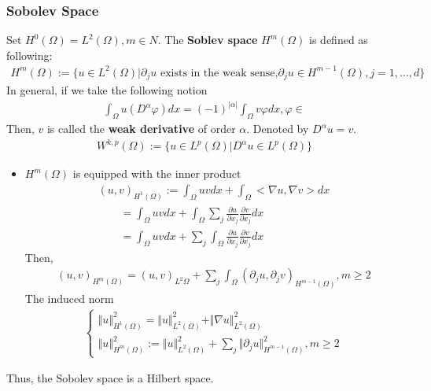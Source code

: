 \documentclass[Total.tex]{subfiles}
\begin{document}
				\subsubsection{Sobolev Space}	
					\begin{Def}
						Set $H^0(\Omega)=L^2(\Omega),m\in N$. The \textbf{Soblev space} $H^m(\Omega)$ is defined as following:
						\begin{gather*}
							H^m(\Omega):=\{u\in L^2(\Omega)|\partial_j u\mbox{ exists in the weak sense,}\partial_j u\in H^{m-1}(\Omega),j=1,\dots,d\}
						\end{gather*}
						In general, if we take the following notion
						\begin{gather*}
							\int_\Omega u(D^\alpha \varphi) dx=(-1)^{|\alpha|}\int_\Omega v\varphi dx,\varphi\in 
						\end{gather*}
						Then, $v$ is called the \textbf{weak derivative} of order $\alpha$. Denoted by $D^\alpha u=v$.
						\begin{gather*}
						 W^{k,p}(\Omega):=\{u\in L^p(\Omega)|D^\alpha u\in L^p(\Omega)\}
						\end{gather*}
					\end{Def}
					\begin{itemize}
						\item $H^m(\Omega)$ is equipped with the inner product
						\begin{gather*}
							(u,v)_{H^1(\Omega)}:=\int_\Omega uvdx+\int_\Omega <\nabla u,\nabla v>dx\\
							\qquad=\int_\Omega uvdx+\int_\Omega \sum_{j} \frac{\partial u}{\partial x_j} \frac{\partial v}{\partial x_j}dx\\
							\qquad =\int_\Omega uvdx+\sum_j \int_\Omega \frac{\partial u}{\partial x_j} \frac{\partial v}{\partial x_j}dx
						\end{gather*}
						Then,
						\begin{gather*}
							(u,v)_{H^m(\Omega)}=(u,v)_{L^2\Omega}+\sum_j \int_\Omega (\partial_j u,\partial_j v)_{H^{m-1}(\Omega)},m\geq 2
						\end{gather*}
						The induced norm
						\begin{gather*}
							\begin{cases}
								\Vert u\Vert^2_{H^1(\Omega)}=\Vert u\Vert^2_{L^2(\Omega)}+\Vert \nabla u\Vert^2_{L^2(\Omega)}\\
								\Vert u\Vert^2_{H^m(\Omega)}:=\Vert u\Vert^2_{L^2(\Omega)}+\sum_j \Vert\partial_j u\Vert^2_{H^{{m-1}}(\Omega)},m\geq 2
							\end{cases}
						\end{gather*}
					\end{itemize}
					Thus, the Sobolev space is a Hilbert space.
\end{document}
